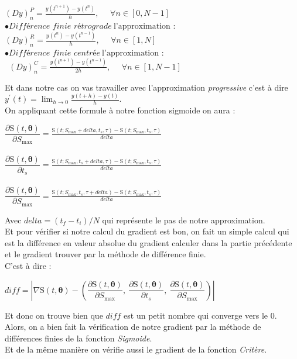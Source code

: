 \documentclass{article}
\begin{document}
  $(Dy)_{n}^{P}=\frac{y(t^{n+1})-y(t^{n})}{h}, ~~~~~~ \forall n \in [0,N-1]$\\


$\bullet \textit{Différence finie rétrograde}~\text{l'approximation}$ :\\

  $(Dy)_{n}^{R}=\frac{y(t^{n})-y(t^{n-1})}{h}, ~~~~~~ \forall n \in [1,N]$\\


$\bullet \textit{Différence finie centrée}~\text{l'approximation}$ :\\
\
  $(Dy)_{n}^{C}=\frac{y(t^{n+1})-y(t^{n-1})}{2h}, ~~~~~~ \forall n \in [1,N-1]$

Et dans notre cas on vas travailler avec l'approximation \textit{progressive} c'est à dire $y^{'}(t)=\lim_{h\rightarrow 0} \frac{y(t+h)-y(t)}{h}$.\\
 On appliquant cette formule à notre fonction sigmoide on aura : \\

\begin{center}
$\dfrac{\partial \text{S}(t,\boldsymbol{\theta })}{ \partial S_{\text{max}}}=\frac{\text{S}(t;S_{\max}+delta,t_{s},\tau)-\text{S}(t;S_{\max},t_{s},\tau)}{delta}$\\
$~$\\
$\dfrac{\partial \text{S}(t,\boldsymbol{\theta })}{ \partial t_{s}}=\frac{\text{S}(t;S_{\max},t_{s}+delta,\tau)-\text{S}(t;S_{\max},t_{s},\tau)}{delta}$\\
$~$\\
$\dfrac{\partial \text{S}(t,\boldsymbol{\theta })}{ \partial S_{\text{max}}}=\frac{\text{S}(t;S_{\max},t_{s},\tau+delta)-\text{S}(t;S_{\max},t_{s},\tau)}{delta}$\\
\end{center}

Avec $delta=(t_{f}-t_{i})/N$ qui représente le pas de notre approximation.\\
Et pour vérifier si notre calcul du gradient est bon, on fait un simple calcul qui est la différence en valeur absolue du gradient calculer dans la partie précédente et le gradient trouver par la méthode de différence finie.\\
C'est à dire :\\
\begin{center}
  $diff=|{\nabla} \text{S}(t,\boldsymbol{\theta })-(\dfrac{\partial \text{S}(t,\boldsymbol{\theta })}{ \partial S_{\text{max}}},~\dfrac{\partial \text{S}(t,\boldsymbol{\theta })}{ \partial t_{s}},~\dfrac{\partial \text{S}(t,\boldsymbol{\theta })}{ \partial S_{\text{max}}})|$
\end{center}
Et donc on trouve bien que $diff$ est un petit nombre qui converge vers le $0$.\\ 
Alors, on a bien fait la vérification de notre gradient par la méthode de différences finies de la fonction \textit{Sigmoide}.\\
Et de la m\^{e}me manière on vérifie aussi le gradient de la fonction \textit{Critère}.\\
\end{document}

